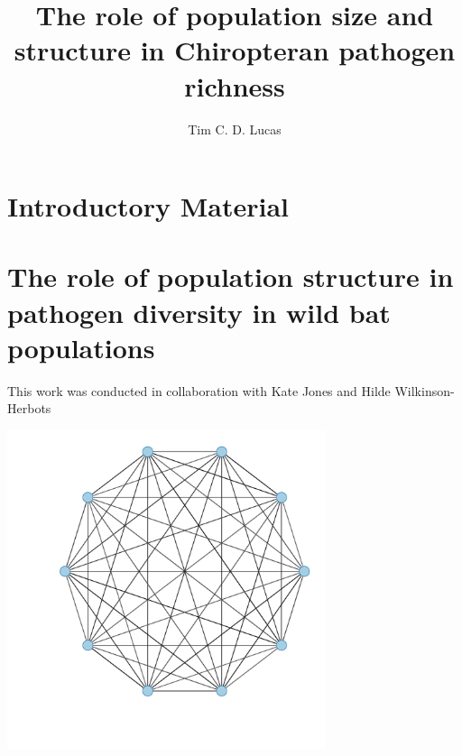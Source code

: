 \documentclass[11pt,phd,a4paper,twoside]{PrettyStanley}
\title{The role of population size and structure in Chiropteran pathogen richness}
\author{Tim C. D. Lucas}
\begin{document}
\color{prettytext}






\chapter{Introductory Material}
\label{chapterlabel1}




\chapter{The role of population structure in pathogen diversity in wild bat populations}{This work was conducted in collaboration with Kate Jones and Hilde Wilkinson-Herbots}

\label{ch:empirical}

\begin{center}
\includegraphics[width=0.7\textwidth]{imgs/fullyConnected.pdf}
\end{center}

\end{document}

